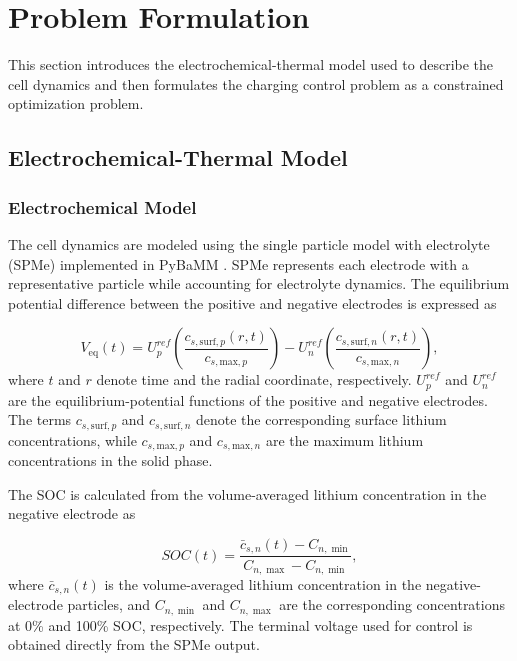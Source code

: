 \section{Problem Formulation}

This section introduces the electrochemical-thermal model used to describe the cell dynamics and then formulates the charging control problem as a constrained optimization problem.

\subsection{Electrochemical-Thermal Model}

\subsubsection{Electrochemical Model}

The cell dynamics are modeled using the single particle model with electrolyte (SPMe) implemented in PyBaMM \cite{23,25}. SPMe represents each electrode with a representative particle while accounting for electrolyte dynamics. The equilibrium potential difference between the positive and negative electrodes is expressed as

\begin{equation}\label{eq:voltage}
    V_{\mathrm{eq}}(t)
    =
    U^{ref}_{p}
    \left(
    \frac{c_{s,\mathrm{surf},p}(r,t)}
    {c_{s,\mathrm{max},p}}
    \right)
    -
    U^{ref}_{n}
    \left(
    \frac{c_{s,\mathrm{surf},n}(r,t)}
    {c_{s,\mathrm{max},n}}
    \right),
\end{equation}
where $t$ and $r$ denote time and the radial coordinate, respectively.
$U^{ref}_{p}$ and $U^{ref}_{n}$ are the equilibrium-potential functions of the positive and negative electrodes.
The terms $c_{s,\mathrm{surf},p}$ and $c_{s,\mathrm{surf},n}$ denote the corresponding surface lithium concentrations, while $c_{s,\mathrm{max},p}$ and $c_{s,\mathrm{max},n}$ are the maximum lithium concentrations in the solid phase.

The SOC is calculated from the volume-averaged lithium concentration in the negative electrode as

\begin{equation}\label{eq:soc}
    SOC(t)
    =
    \frac{\bar{c}_{s,n}(t)-C_{n,\min}}
    {C_{n,\max}-C_{n,\min}},
\end{equation}
where $\bar{c}_{s,n}(t)$ is the volume-averaged lithium concentration in the negative-electrode particles, and $C_{n,\min}$ and $C_{n,\max}$ are the corresponding concentrations at 0\% and 100\% SOC, respectively. The terminal voltage used for control is obtained directly from the SPMe output.

